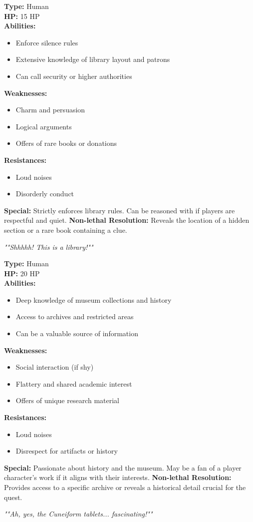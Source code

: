\documentclass{article}
\newcommand{\monstercard}[8]{%
    \begin{tcolorbox}[
        width=5.8cm, %
        colback=boxcontentbg,
        colframe=boxborder,
        coltitle=boxheaderfg,
        colbacktitle=boxheaderbg,
        fonttitle=\bfseries\sffamily\large,
        title=#1, %
        arc=10pt, %
        boxrule=2pt, %
        left=3mm,
        right=3mm,
        top=2mm,
        bottom=2mm,
        enhanced,
        nobeforeafter,
    ]%
        \textbf{Type:} #2\\
        \textbf{HP:} #3\\
        \vspace{0.1cm} %
        \textbf{Abilities:}
        \begin{itemize}[nosep, leftmargin=*, itemsep=0pt, topsep=0pt, parsep=0pt, partopsep=0pt]
            #4
        \end{itemize}
        \vspace{0.1cm} %
        \textbf{Weaknesses:}
        \begin{itemize}[nosep, leftmargin=*, itemsep=0pt, topsep=0pt, parsep=0pt, partopsep=0pt]
            #5
        \end{itemize}
         \vspace{0.1cm} %
        \textbf{Resistances:}
        \begin{itemize}[nosep, leftmargin=*, itemsep=0pt, topsep=0pt, parsep=0pt, partopsep=0pt]
            #6
        \end{itemize}
         \vspace{0.1cm} %
        \textbf{Special:} #7
        
        \vspace{0.3cm} %
        \centering\itshape "#8"%
    \end{tcolorbox}%
}%
\begin{document}
\noindent %
\begin{minipage}[t]{.48\textwidth}
\monstercard{Stern Librarian}
{Human}
{15 HP}
{\item Enforce silence rules\\
\item Extensive knowledge of library layout and patrons\\
\item Can call security or higher authorities}
{\item Charm and persuasion\\
\item Logical arguments\\
\item Offers of rare books or donations}
{\item Loud noises\\
\item Disorderly conduct}
{Strictly enforces library rules. Can be reasoned with if players are respectful and quiet. \textbf{Non-lethal Resolution:} Reveals the location of a hidden section or a rare book containing a clue.}
{"Shhhhh! This is a library!"}
\end{minipage}
\hfill
\begin{minipage}[t]{.48\textwidth}
\monstercard{Museum Archivist}
{Human}
{20 HP}
{\item Deep knowledge of museum collections and history\\
\item Access to archives and restricted areas\\
\item Can be a valuable source of information}
{\item Social interaction (if shy)\
\item Flattery and shared academic interest\\
\item Offers of unique research material}
{\item Loud noises\\
\item Disrespect for artifacts or history}
{Passionate about history and the museum. May be a fan of a player character's work if it aligns with their interests. \textbf{Non-lethal Resolution:} Provides access to a specific archive or reveals a historical detail crucial for the quest.}
{"Ah, yes, the Cuneiform tablets... fascinating!"}
\end{minipage}
\end{document}
